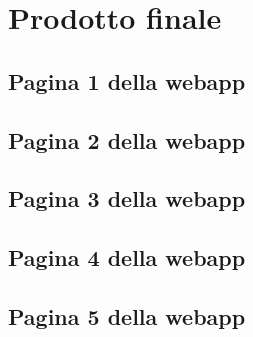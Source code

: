 \chapter{Prodotto finale}
\label{cap:prodotto-finale}


\section{Pagina 1 della webapp}


\section{Pagina 2 della webapp}


\section{Pagina 3 della webapp}


\section{Pagina 4 della webapp}


\section{Pagina 5 della webapp}
